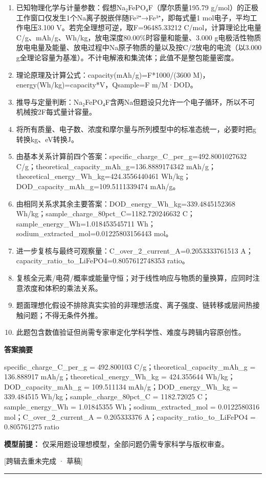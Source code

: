 \documentclass[UTF8,11pt,a4paper]{ctexart}
\begin{document}
\begin{enumerate}
\item 已知物理化学与计量参数：假想Na₂FePO₄F（摩尔质量195.79 g/mol）的正极工作窗口仅发生1个Na离子脱嵌伴随Fe²⁺→Fe³⁺，即每式量1 mol电子，平均工作电压3.100 V。若完全理想可逆，取F=96485.33212 C/mol，计算理论比电量C/g、mAh/g、Wh/kg，放电深度80.00\%时容量和能量、3.000 g电极活性物质放电电量及能量、放电过程中Na原子物质的量以及按C/2放电的电流（以3.000 g全理论容量为基准）。不计电解液和集流体；此值不是整包能量密度。
\item 理论原理及计算公式：capacity(mAh/g)=F*1000/(3600 M)，energy(Wh/kg)=capacity*V，Qsample=F m/M·DOD。
\item 推导与定量判断：Na₂FePO₄F含两Na但题设只允许一个电子循环，所以不可机械按2F每式量计容量。
\item 将所有质量、电子数、浓度和摩尔量与所列模型中的标准态统一，必要时把g转换kg、eV转换J。
\item 由基本关系计算前四个答案：specific\_charge\_C\_per\_g=492.8001027632 C/g；theoretical\_capacity\_mAh\_g=136.8889174342 mAh/g；theoretical\_energy\_Wh\_kg=424.3556440461 Wh/kg；DOD\_capacity\_mAh\_g=109.5111339474 mAh/g。
\item 由相同关系求其余主要答案：DOD\_energy\_Wh\_kg=339.4845152368 Wh/kg；sample\_charge\_80pct\_C=1182.720246632 C；sample\_energy\_Wh=1.018453545711 Wh；sodium\_extracted\_mol=0.01225803156443 mol。
\item 进一步复核与最终可观察量：C\_over\_2\_current\_A=0.2053333761513 A；capacity\_ratio\_to\_LiFePO4=0.8057612748353 ratio。
\item 复核全元素/电荷/概率或能量守恒；对于线性响应与物质的量换算，应同时注意浓度和体积的乘法关系。
\item 题面理想化假设不排除真实实验的非理想活度、离子强度、链转移或层间热接触问题；不得无条件外推。
\item 此题包含数值验证但尚需专家审定化学科学性、难度与跨辑内容原创性。
\end{enumerate}
\noindent\textbf{答案摘要}\par
specific\_charge\_C\_per\_g = 492.800103 C/g；theoretical\_capacity\_mAh\_g = 136.888917 mAh/g；theoretical\_energy\_Wh\_kg = 424.355644 Wh/kg；DOD\_capacity\_mAh\_g = 109.511134 mAh/g；DOD\_energy\_Wh\_kg = 339.484515 Wh/kg；sample\_charge\_80pct\_C = 1182.72025 C；sample\_energy\_Wh = 1.01845355 Wh；sodium\_extracted\_mol = 0.0122580316 mol；C\_over\_2\_current\_A = 0.205333376 A；capacity\_ratio\_to\_LiFePO4 = 0.805761275 ratio\par
\noindent\textbf{模型前提：}
仅采用题设理想模型，全部问题仍需专家科学与版权审查。\par
\noindent\textcolor{red!65!black}{[跨辑去重未完成 · 草稿]} \par
\medskip\hrule\medskip
{}
\end{document}
